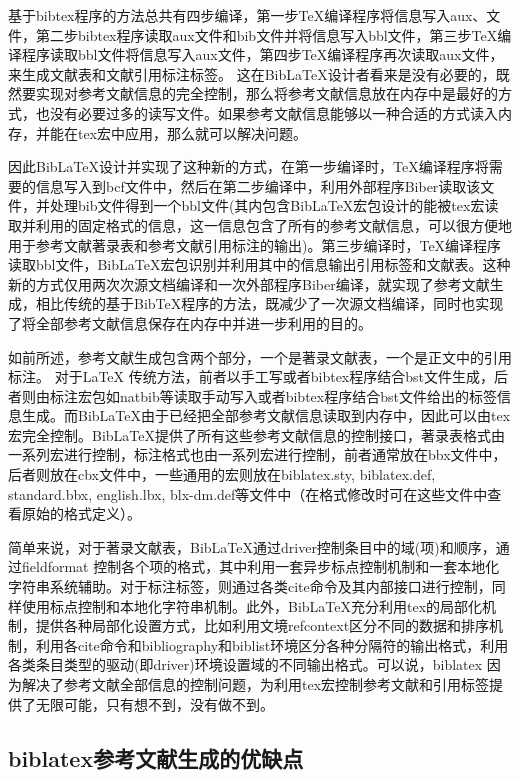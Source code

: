 \documentclass[twoside]{article} %
\begin{document}
基于bibtex程序的方法总共有四步编译，第一步\TeX{}编译程序将信息写入aux、文件，第二步bibtex程序读取aux文件和bib文件并将信息写入bbl文件，第三步\TeX{}编译程序读取bbl文件将信息写入aux文件，第四步\TeX{}编译程序再次读取aux文件，来生成文献表和文献引用标注标签。
这在BibLaTeX设计者看来是没有必要的，既然要实现对参考文献信息的完全控制，那么将参考文献信息放在内存中是最好的方式，也没有必要过多的读写文件。如果参考文献信息能够以一种合适的方式读入内存，并能在tex宏中应用，那么就可以解决问题。

因此BibLaTeX设计并实现了这种新的方式，在第一步编译时，\TeX{}编译程序将需要的信息写入到bcf文件中，然后在第二步编译中，利用外部程序Biber读取该文件，并处理bib文件得到一个bbl文件(其内包含BibLaTeX宏包设计的能被tex宏读取并利用的固定格式的信息，这一信息包含了所有的参考文献信息，可以很方便地用于参考文献著录表和参考文献引用标注的输出)。第三步编译时，\TeX{}编译程序读取bbl文件，BibLaTeX宏包识别并利用其中的信息输出引用标签和文献表。这种新的方式仅用两次次源文档编译和一次外部程序Biber编译，就实现了参考文献生成，相比传统的基于BibTeX程序的方法，既减少了一次源文档编译，同时也实现了将全部参考文献信息保存在内存中并进一步利用的目的。

如前所述，参考文献生成包含两个部分，一个是著录文献表，一个是正文中的引用标注。
对于\LaTeX{} 传统方法，前者以手工写或者bibtex程序结合bst文件生成，后者则由标注宏包如natbib等读取手动写入或者bibtex程序结合bst文件给出的标签信息生成。而BibLaTeX由于已经把全部参考文献信息读取到内存中，因此可以由tex宏完全控制。BibLaTeX提供了所有这些参考文献信息的控制接口，著录表格式由一系列宏进行控制，标注格式也由一系列宏进行控制，前者通常放在bbx文件中，后者则放在cbx文件中，一些通用的宏则放在biblatex.sty, biblatex.def, standard.bbx, english.lbx, blx-dm.def等文件中（在格式修改时可在这些文件中查看原始的格式定义）。

简单来说，对于著录文献表，BibLaTeX通过driver控制条目中的域(项)和顺序，通过fieldformat 控制各个项的格式，其中利用一套异步标点控制机制和一套本地化字符串系统辅助。对于标注标签，则通过各类cite命令及其内部接口进行控制，同样使用标点控制和本地化字符串机制。此外，BibLaTeX充分利用tex的局部化机制，提供各种局部化设置方式，比如利用文境refcontext区分不同的数据和排序机制，利用各cite命令和bibliography和biblist环境区分各种分隔符的输出格式，利用各类条目类型的驱动(即driver)环境设置域的不同输出格式。可以说，biblatex 因为解决了参考文献全部信息的控制问题，为利用tex宏控制参考文献和引用标签提供了无限可能，只有想不到，没有做不到。


\subsection{biblatex参考文献生成的优缺点}
\end{document}
